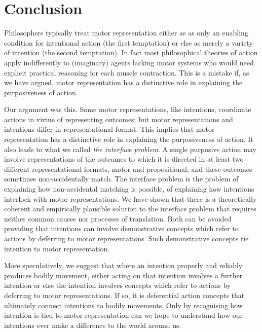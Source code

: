 \documentclass[12pt,\papersize]{extarticle}
\begin{document}
 
\section{Conclusion}

Philosophers typically treat motor representation either as as only an enabling condition for intentional action (the first temptation) or else as merely a variety of intention (the second temptation). 
In fact most philosophical theories of action  apply indifferently to 
(imaginary) agents lacking motor systems
who would need explicit practical reasoning for each muscle contraction. 
This is a mistake if,
as we have argued,
 motor representation has a distinctive role in explaining the purposiveness of action.  

Our argument was this.
Some motor representations, like intentions, coordinate actions in virtue of representing outcomes; but motor representations and intentions differ in representational format.  
This implies that motor representation has a distinctive role in explaining the purposiveness of action. 
It also leads to what we called \emph{the interface problem}.
A single purposive action may involve representations of the outcomes to which it is directed in at least two different representational formats, motor and propositional;
and these outcomes sometimes non-accidentally match.
The interface problem is the problem of explaining how non-accidental matching is possible, of
explaining how intentions interlock with motor representations. 
We have shown that there is a theoretically coherent and empirically plausible solution to the interface problem that requires neither common causes nor processes of translation.
Both can be avoided providing that intentions can involve demonstrative concepts which refer to actions by deferring to motor representations.
Such demonstrative concepts tie intention to motor representation.

More speculatively, we suggest that where an intention properly and reliably produces bodily movement, either acting on that intention involves a further intention or else the intention involves concepts which refer to actions by deferring to motor representations. If so, it is deferential action concepts that ultimately connect intentions to bodily movements. Only by recognising how intention is tied to motor representation can we hope to understand how our intentions ever make a difference to the world around us.
\end{document}
